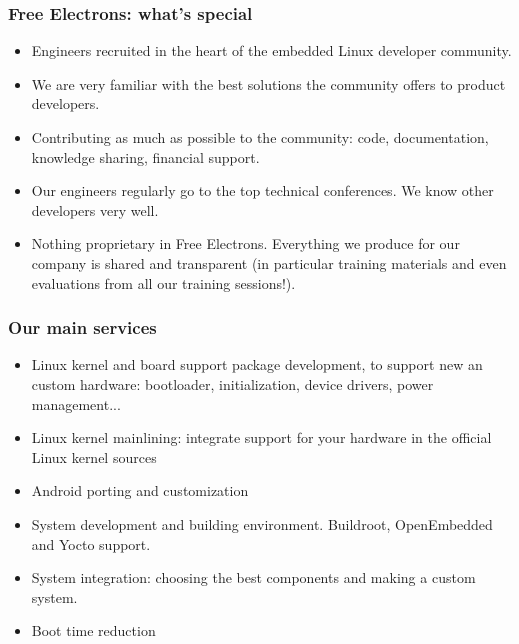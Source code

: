 \begin{frame}
\frametitle{Free Electrons: what's special}
  \begin{itemize}
    \item Engineers recruited in the heart of the embedded Linux
   	  developer community.
    \item We are very familiar with the best solutions the
          community offers to product developers.
    \item Contributing as much as possible to the community:
          code, documentation, knowledge sharing, financial support.
    \item Our engineers regularly go to the top technical
          conferences. We know other developers very well.
    \item Nothing proprietary in Free Electrons. Everything we
          produce for our company is shared and transparent
          (in particular training materials and even evaluations
          from all our training sessions!).
  \end{itemize}
\end{frame}

\begin{frame}
\frametitle{Our main services}
  \begin{itemize}
     \item Linux kernel and board support package development,
    	   to support new an custom hardware:
           bootloader, initialization, device drivers, power
           management...
     \item Linux kernel mainlining: integrate support for your
           hardware in the official Linux kernel sources 
     \item Android porting and customization
     \item System development and building environment.
           Buildroot, OpenEmbedded and Yocto support.
     \item System integration: choosing the best components
           and making a custom system. 
     \item Boot time reduction
  \end{itemize}
\end{frame}

